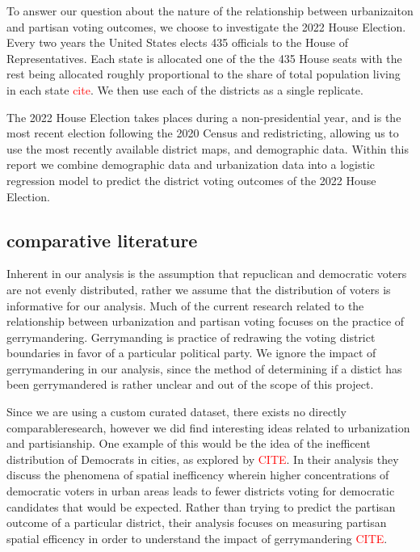 \documentclass[12pt]{article}
\newcommand{\red}[1]{\textcolor{red}{#1}}
\begin{document}
To answer our question about the nature of the relationship between urbanizaiton and partisan voting outcomes, we choose to investigate the 2022 House Election. Every two years the United States elects 435 officials to the House of Representatives. Each state is allocated one of the the 435 House seats with the rest being allocated roughly proportional to the share of total population living in each state \red{cite}. We then use each of the districts as a single replicate. 

The 2022 House Election takes places during a non-presidential year, and is the most recent election following the 2020 Census and redistricting, allowing us to use the most recently available district maps, and demographic data. Within this report we combine demographic data and urbanization data into a logistic regression model to predict the district voting outcomes of the 2022 House Election. 


\subsection*{comparative literature}
Inherent in our analysis is the assumption that repuclican and democratic voters are not evenly distributed, rather we assume that the distribution of voters is informative for our analysis. Much of the current research related to the relationship between urbanization and partisan voting focuses on the practice of gerrymandering. Gerrymanding is practice of redrawing the voting district boundaries in favor of a particular political party. We ignore the impact of gerrymandering in our analysis, since the method of determining if a distict has been gerrymandered is rather unclear and out of the scope of this project.

Since we are using a custom curated dataset, there exists no directly comparableresearch, however we did find interesting ideas related to urbanization and partisianship. One example of this would be the idea of the inefficent distribution of Democrats in cities, as explored by \textcolor{red}{CITE}. In their analysis they discuss the phenomena of spatial inefficency wherein higher concentrations of democratic voters in urban areas leads to fewer districts voting for democratic candidates that would be expected. Rather than trying to predict the partisan outcome of a particular district, their analysis focuses on measuring partisan spatial efficency in order to understand the impact of gerrymandering \red{CITE}. 
\end{document}
